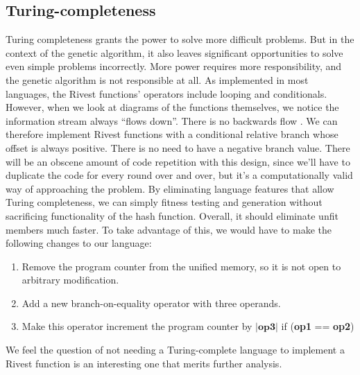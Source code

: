 \documentclass{article}
\begin{document}
\subsection{Turing-completeness}
Turing completeness grants the power to solve more difficult problems. But in the context of the genetic algorithm, it also leaves significant opportunities to solve even simple problems incorrectly. More power requires more responsibility, and the genetic algorithm is not responsible at all. As implemented in most languages, the Rivest functions' operators include looping and conditionals. However, when we look at diagrams of the functions themselves, we notice the information stream always ``flows down''. There is no backwards flow \cite{MD5Diagram}. We can therefore implement Rivest functions with a conditional relative branch whose offset is always positive. There is no need to have a negative branch value. There will be an obscene amount of code repetition with this design, since we'll have to duplicate the code for every round over and over, but it's a computationally valid way of approaching the problem. By eliminating language features that allow Turing completeness, we can simply fitness testing and generation without sacrificing functionality of the hash function. Overall, it should eliminate unfit members much faster. To take advantage of this, we would have to make the following changes to our language:
\begin{enumerate}
\item Remove the program counter from the unified memory, so it is not open to arbitrary modification.
\item Add a new branch-on-equality operator with three operands.
\item Make this operator increment the program counter by $|\textbf{op3}|$ if (\textbf{op1} == \textbf{op2})
\end{enumerate}

We feel the question of not needing a Turing-complete language to implement a Rivest function is an interesting one that merits further analysis.
\end{document}
